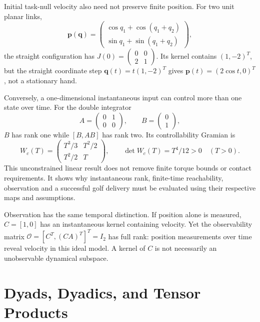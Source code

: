 Initial task-null velocity also need not preserve finite position. For two unit planar links,
\[
\mathbf p(\mathbf q)=
\begin{pmatrix}\cos q_1+\cos(q_1+q_2)\\
\sin q_1+\sin(q_1+q_2)\end{pmatrix},
\]
the straight configuration has $J(0)=\begin{pmatrix}0&0\\2&1\end{pmatrix}$. Its kernel contains $(1,-2)^T$, but the straight coordinate step $\mathbf q(t)=t(1,-2)^T$ gives $\mathbf p(t)=(2\cos t,0)^T$, not a stationary hand.

Conversely, a one-dimensional instantaneous input can control more than one state over time. For the double integrator
\[
A=\begin{pmatrix}0&1\\0&0\end{pmatrix},\qquad
B=\begin{pmatrix}0\\1\end{pmatrix},
\]
$B$ has rank one while $[B,AB]$ has rank two. Its controllability Gramian is
\[
W_c(T)=\begin{pmatrix}T^3/3&T^2/2\\T^2/2&T\end{pmatrix},
\qquad \det W_c(T)=T^4/12>0\quad(T>0).
\]
This unconstrained linear result does not remove finite torque bounds or contact requirements. It shows why instantaneous rank, finite-time reachability, observation and a successful golf delivery must be evaluated using their respective maps and assumptions.

Observation has the same temporal distinction. If position alone is measured, $C=[1,0]$ has an instantaneous kernel containing velocity. Yet the observability matrix $\mathcal O=[C^T,(CA)^T]^T=I_2$ has full rank: position measurements over time reveal velocity in this ideal model. A kernel of $C$ is not necessarily an unobservable dynamical subspace.


\section{Dyads, Dyadics, and Tensor Products}
\label{sec:dyads-dyadics}

